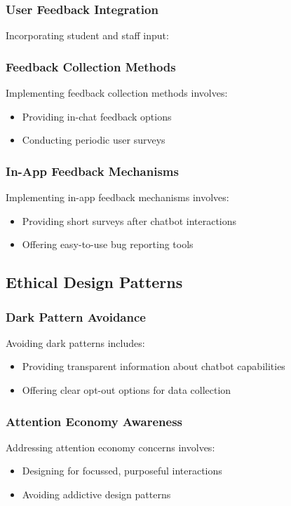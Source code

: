 \documentclass[14pt,a4paper]{article}
\begin{document}
\begin{multicols}{2}
\subsubsection{User Feedback Integration}
Incorporating student and staff input:

\subsubsection*{Feedback Collection Methods}
Implementing feedback collection methods \textit{\parencite[pp. 100-50]{TullisAlbert2024}} involves:
\begin{itemize}
    \item Providing in-chat feedback options
    \item Conducting periodic user surveys
\end{itemize}

\subsubsection*{In-App Feedback Mechanisms}
Implementing in-app feedback mechanisms \textit{\parencite[pp. 100-150]{TullisAlbert2024}} involves:
\begin{itemize}
    \item Providing short surveys after chatbot interactions
    \item Offering easy-to-use bug reporting tools
\end{itemize}

\subsection{Ethical Design Patterns}
\subsubsection{Dark Pattern Avoidance}
Avoiding dark patterns \textit{\parencite{Brignull2023}} includes:
\begin{itemize}
    \item Providing transparent information about chatbot capabilities
    \item Offering clear opt-out options for data collection
\end{itemize}


\subsubsection{Attention Economy Awareness}
Addressing attention economy concerns \textit{\parencite[pp. 10-30]{Williams2024}} involves:
\begin{itemize}
    \item Designing for focussed, purposeful interactions
    \item Avoiding addictive design patterns
\end{itemize}




\end{multicols}
\end{document}
